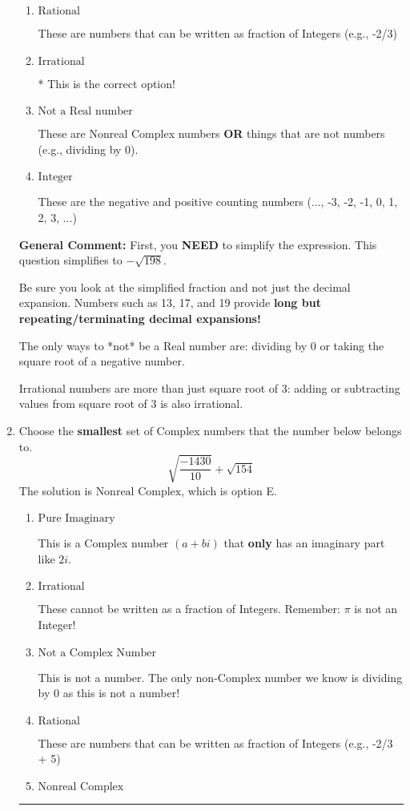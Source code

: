 \documentclass{extbook}[14pt]
\newcommand{\litem}[1]{\item #1

\rule{\textwidth}{0.4pt}}
\begin{document}
\begin{enumerate}
{\begin{enumerate}[label=\Alph*.]
These are the counting numbers with 0 (0, 1, 2, 3, ...)
\item \( \text{Rational} \)

These are numbers that can be written as fraction of Integers (e.g., -2/3)
\item \( \text{Irrational} \)

* This is the correct option!
\item \( \text{Not a Real number} \)

These are Nonreal Complex numbers \textbf{OR} things that are not numbers (e.g., dividing by 0).
\item \( \text{Integer} \)

These are the negative and positive counting numbers (..., -3, -2, -1, 0, 1, 2, 3, ...)
\end{enumerate}

\textbf{General Comment:} First, you \textbf{NEED} to simplify the expression. This question simplifies to $-\sqrt{198}$. 
 
 Be sure you look at the simplified fraction and not just the decimal expansion. Numbers such as 13, 17, and 19 provide \textbf{long but repeating/terminating decimal expansions!} 
 
 The only ways to *not* be a Real number are: dividing by 0 or taking the square root of a negative number. 
 
 Irrational numbers are more than just square root of 3: adding or subtracting values from square root of 3 is also irrational.
}
\litem{
Choose the \textbf{smallest} set of Complex numbers that the number below belongs to.
\[ \sqrt{\frac{-1430}{10}}+\sqrt{154} \]The solution is \( \text{Nonreal Complex} \), which is option E.\begin{enumerate}[label=\Alph*.]
\item \( \text{Pure Imaginary} \)

This is a Complex number $(a+bi)$ that \textbf{only} has an imaginary part like $2i$.
\item \( \text{Irrational} \)

These cannot be written as a fraction of Integers. Remember: $\pi$ is not an Integer!
\item \( \text{Not a Complex Number} \)

This is not a number. The only non-Complex number we know is dividing by 0 as this is not a number!
\item \( \text{Rational} \)

These are numbers that can be written as fraction of Integers (e.g., -2/3 + 5)
\item \( \text{Nonreal Complex} \)


\end{enumerate}}
\end{enumerate}
\end{document}
